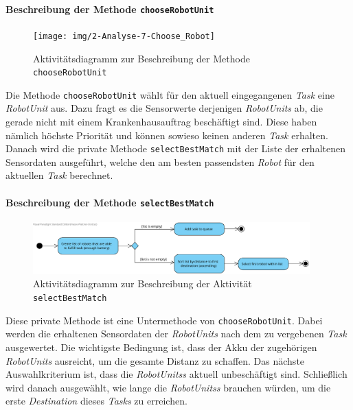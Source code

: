 			
			\paragraph{Beschreibung der Methode \texttt{chooseRobotUnit}}
						\begin{figure}[H]
			\centering
			\texttt{[image: img/2-Analyse-7-Choose\_Robot]}
			\caption{Aktivitätsdiagramm zur Beschreibung der Methode \texttt{chooseRobotUnit}}
			\label{ChooseRobotActivity}
			\end{figure}			
			
			Die Methode \texttt{chooseRobotUnit} wählt für den aktuell eingegangenen \emph{Task} eine \emph{RobotUnit} aus. 
			Dazu fragt es die Sensorwerte derjenigen \textit{RobotUnits} ab, die gerade nicht mit einem Krankenhausauftrag beschäftigt sind. Diese haben nämlich höchste Priorität und können sowieso keinen anderen \textit{Task} erhalten. Danach wird die private Methode \texttt{selectBestMatch} mit der Liste der erhaltenen Sensordaten ausgeführt, welche den am besten passendsten \textit{Robot} für den aktuellen \textit{Task} berechnet.
				

			
			\paragraph{Beschreibung der Methode \texttt{selectBestMatch}}
			\begin{figure}[H]
			\centering
			\includegraphics[width=0.95\textwidth]{img/2-Entwurf-SelectBestMatch}
			\caption{Aktivitätsdiagramm zur Beschreibung der Aktivität \texttt{selectBestMatch}}
			\label{SelectBestMatchActivity}
			\end{figure}
			Diese private Methode ist eine Untermethode von \texttt{chooseRobotUnit}. Dabei werden die erhaltenen Sensordaten der \textit{RobotUnits} nach dem zu vergebenen \textit{Task} ausgewertet. Die wichtigste Bedingung ist, dass der Akku der zugehörigen \textit{RobotUnits} ausreicht, um die gesamte Distanz zu schaffen. Das nächste Auswahlkriterium ist, dass die \textit{RobotUnitss} aktuell unbeschäftigt sind. Schließlich wird danach ausgewählt, wie lange die \textit{RobotUnitss} brauchen würden, um die erste \textit{Destination} dieses \textit{Tasks} zu erreichen.


